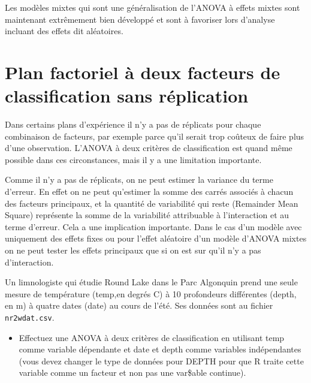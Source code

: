 \documentclass[
  12pt,
]{book}
\makeatletter
\providecommand{\tightlist}{%
  \setlength{\itemsep}{0pt}\setlength{\parskip}{0pt}}
\newenvironment{kframe}{%
\medskip{}
\setlength{\fboxsep}{.8em}
\def\at@end@of@kframe{}%
\ifinner\ifhmode%
 \def\at@end@of@kframe{\end{minipage}}%
 \begin{minipage}{\columnwidth}%
\fi\fi%
\def\FrameCommand##1{\hskip\@totalleftmargin \hskip-\fboxsep
\colorbox{incolor}{##1}\hskip-\fboxsep
    \hskip-\linewidth \hskip-\@totalleftmargin \hskip\columnwidth}%
\MakeFramed {\advance\hsize-\width
  \@totalleftmargin\z@ \linewidth\hsize
  \@setminipage}}%
{\par\unskip\endMakeFramed%
\at@end@of@kframe}
\newenvironment{rmdblock}[1]
 {
 \begin{itemize}
 \renewcommand{\labelitemi}{
   \raisebox{-.7\height}[0pt][0pt]{
     {\setkeys{Gin}{width=3em,keepaspectratio}\texttt{[image: images/\#1]}}
   }
 }
 \begin{kframe}
 \setlength{\fboxsep}{1em}
 \item
 }
 {
 \end{kframe}
 \end{itemize}
 }
\newenvironment{rmdnote}
  {\begin{rmdblock}{note}}
  {\end{rmdblock}}
\newenvironment{rmdwarning}
  {\begin{rmdblock}{warning}}
  {\end{rmdblock}}
\makeatother
\begin{document}
\begin{rmdnote}
Les modèles mixtes qui sont une généralisation de l'ANOVA à effets mixtes sont maintenant extrêmement bien développé et sont à favoriser lors d'analyse incluant des effets dit aléatoires.
\end{rmdnote}

\hypertarget{plan-factoriel-uxe0-deux-facteurs-de-classification-sans-ruxe9plication}{%
\section{Plan factoriel à deux facteurs de classification sans réplication}\label{plan-factoriel-uxe0-deux-facteurs-de-classification-sans-ruxe9plication}}

Dans certains plans d'expérience il n'y a pas de réplicats pour chaque combinaison de facteurs, par exemple parce qu'il serait trop coûteux de faire plus d'une observation. L'ANOVA à deux critères de classification est quand même possible dans ces circonstances, mais il y a une limitation importante.

\begin{rmdwarning}
Comme il n'y a pas de réplicats, on ne peut estimer la variance du terme d'erreur. En effet on ne peut qu'estimer la somme des carrés associés à chacun des facteurs principaux, et la quantité de variabilité qui reste (Remainder Mean Square) représente la somme de la variabilité attribuable à l'interaction et au terme d'erreur. Cela a une implication importante. Dans le cas d'un modèle avec uniquement des effets fixes ou pour l'effet aléatoire d'un modèle d'ANOVA mixtes on ne peut tester les effets principaux que si on est sur qu'il n'y a pas d'interaction.
\end{rmdwarning}

Un limnologiste qui étudie Round Lake dans le Parc Algonquin prend une seule mesure de température (temp,en degrés C) à 10 profondeurs différentes (depth, en m) à quatre dates (date) au cours de l'été. Ses données sont au fichier \texttt{nr2wdat.csv}.

\begin{itemize}
\tightlist
\item
  Effectuez une ANOVA à deux critères de classification en utilisant temp comme variable dépendante et date et depth comme variables indépendantes (vous devez changer le type de données pour DEPTH pour que R traite cette variable comme un facteur et non pas une var\$able continue).
\end{itemize}
\end{document}
